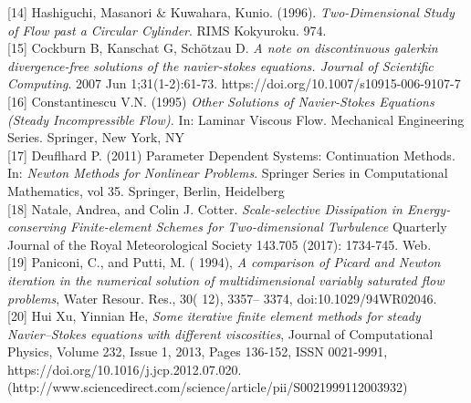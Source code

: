 \documentclass[11pt,twoside,a4paper]{article}
\begin{document}
[14] Hashiguchi, Masanori \& Kuwahara, Kunio. (1996). \textit{Two-Dimensional Study of Flow past a Circular Cylinder}. RIMS Kokyuroku. 974. \\

[15] Cockburn B, Kanschat G, Schötzau D. \textit{A note on discontinuous galerkin divergence-free solutions of the navier-stokes equations. Journal of Scientific Computing}. 2007 Jun 1;31(1-2):61-73. https://doi.org/10.1007/s10915-006-9107-7\\

[16] Constantinescu V.N. (1995) \textit{Other Solutions of Navier-Stokes Equations (Steady Incompressible Flow).} In: Laminar Viscous Flow. Mechanical Engineering Series. Springer, New York, NY\\

[17] Deuflhard P. (2011) Parameter Dependent Systems: Continuation Methods. In: \textit{Newton Methods for Nonlinear Problems}. Springer Series in Computational Mathematics, vol 35. Springer, Berlin, Heidelberg\\

[18] Natale, Andrea, and Colin J. Cotter. \textit{Scale‐selective Dissipation in Energy‐conserving Finite‐element Schemes for Two‐dimensional Turbulence}  Quarterly Journal of the Royal Meteorological Society 143.705 (2017): 1734-745. Web.\\

[19] Paniconi, C., and Putti, M. ( 1994), \textit{A comparison of Picard and Newton iteration in the numerical solution of multidimensional variably saturated flow problems}, Water Resour. Res., 30( 12), 3357– 3374, doi:10.1029/94WR02046.\\

[20] Hui Xu, Yinnian He,
\textit{Some iterative finite element methods for steady Navier–Stokes equations with different viscosities},
Journal of Computational Physics,
Volume 232, Issue 1,
2013,
Pages 136-152,
ISSN 0021-9991,
https://doi.org/10.1016/j.jcp.2012.07.020.
(http://www.sciencedirect.com/science/article/pii/S0021999112003932)
\end{document}
